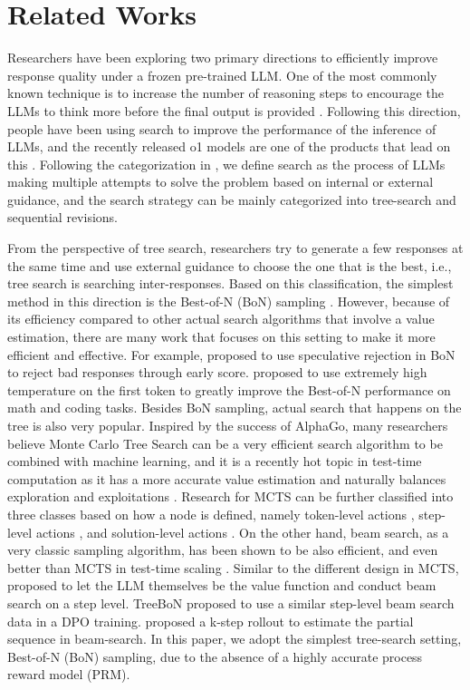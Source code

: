 \section{Related Works}
Researchers have been exploring two primary directions to efficiently improve response quality under a frozen pre-trained LLM. 
One of the most commonly known technique is to increase the number of reasoning steps to encourage the LLMs to think more before the final output is provided \cite{DBLP:conf/nips/Wei0SBIXCLZ22}. Following this direction, people have been using search to improve the performance of the inference of LLMs, and the recently released o1 models are one of the products that lead on this \cite{jaech2024openai}. Following the categorization in \citet{zeng2024scaling}, we define search as the process of LLMs making multiple attempts to solve the problem based on internal or external guidance, and the search strategy can be mainly categorized into tree-search and sequential revisions.

From the perspective of tree search, researchers try to generate a few responses at the same time and use external guidance to choose the one that is the best, i.e., tree search is searching inter-responses. Based on this classification, the simplest method in this direction is the Best-of-N (BoN) sampling \cite{cobbe2021gsm8k, brown2024large}. However, because of its efficiency compared to other actual search algorithms that involve a value estimation, there are many work that focuses on this setting to make it more efficient and effective. For example, \citet{sun2024fast} proposed to use speculative rejection in BoN to reject bad responses through early score. \citet{chen2024flaming} proposed to use extremely high temperature on the first token to greatly improve the Best-of-N performance on math and coding tasks. 
Besides BoN sampling, actual search that happens on the tree is also very popular. 
Inspired by the success of AlphaGo, many researchers believe Monte Carlo Tree Search can be a very efficient search algorithm to be combined with machine learning, and it is a recently hot topic in test-time computation as it has a more accurate value estimation and naturally balances exploration and exploitations \cite{zeng2024scaling}. Research for MCTS can be further classified into three classes based on how a node is defined, namely token-level actions \cite{zhang2023planning, liu2023making}, step-level actions \cite{hao2023reasoning, chen-etal-2024-step, zhou2023language}, and solution-level actions \cite{zhang2024accessing, zhang2024llama}.  
On the other hand, beam search, as a very classic sampling algorithm, has been shown to be also efficient, and even better than MCTS in test-time scaling \cite{chen2024alphamathzeroprocesssupervision}. 
Similar to the different design in MCTS, \citet{xie2024self} proposed to let the LLM themselves be the value function and conduct beam search on a step level. 
TreeBoN\cite{qiu2024treebon} proposed to use a similar step-level beam search data in a DPO training. 
\citet{snell2024scaling} proposed a k-step rollout to estimate the partial sequence in beam-search. 
In this paper, we adopt the simplest tree-search setting, Best-of-N (BoN) sampling, due to the absence of a highly accurate process reward model (PRM).

